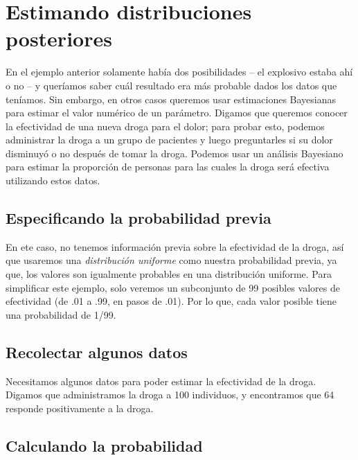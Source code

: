 \documentclass[
  12pt,
]{book}
\theoremstyle{definition}
\theoremstyle{definition}
\theoremstyle{definition}
\theoremstyle{remark}
\begin{document}
\hypertarget{estimando-distribuciones-posteriores}{%
\section{Estimando distribuciones posteriores}\label{estimando-distribuciones-posteriores}}

En el ejemplo anterior solamente había dos posibilidades -- el explosivo estaba ahí o no -- y queríamos saber cuál resultado era más probable dados los datos que teníamos. Sin embargo, en otros casos queremos usar estimaciones Bayesianas para estimar el valor numérico de un parámetro. Digamos que queremos conocer la efectividad de una nueva droga para el dolor; para probar esto, podemos administrar la droga a un grupo de pacientes y luego preguntarles si su dolor disminuyó o no después de tomar la droga. Podemos usar un análisis Bayesiano para estimar la proporción de personas para las cuales la droga será efectiva utilizando estos datos.

\hypertarget{especificando-la-probabilidad-previa}{%
\subsection{Especificando la probabilidad previa}\label{especificando-la-probabilidad-previa}}

En ete caso, no tenemos información previa sobre la efectividad de la droga, así que usaremos una \emph{distribución uniforme} como nuestra probabilidad previa, ya que, los valores son igualmente probables en una distribución uniforme. Para simplificar este ejemplo, solo veremos un subconjunto de 99 posibles valores de efectividad (de .01 a .99, en pasos de .01). Por lo que, cada valor posible tiene una probabilidad de 1/99.

\hypertarget{recolectar-algunos-datos}{%
\subsection{Recolectar algunos datos}\label{recolectar-algunos-datos}}

Necesitamos algunos datos para poder estimar la efectividad de la droga. Digamos que administramos la droga a 100 individuos, y encontramos que 64 responde positivamente a la droga.

\hypertarget{calculando-la-probabilidad-1}{%
\subsection{Calculando la probabilidad}\label{calculando-la-probabilidad-1}}
\end{document}
